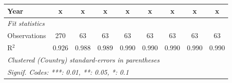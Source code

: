\begin{table}[htbp]
\begin{tabular}{lcccccccc}
      Year                                                    & x              & x       & x       & x             & x             & x             & x             & x\\  
      \midrule \emph{Fit statistics}\\
      Observations                                            & 270            & 63      & 63      & 63            & 63            & 63            & 63            & 63\\  
      R$^2$                                                   & 0.926          & 0.988   & 0.989   & 0.990         & 0.990         & 0.990         & 0.990         & 0.990\\  
      \midrule
      \multicolumn{9}{l}{\emph{Clustered (Country) standard-errors in parentheses}}\\
      \multicolumn{9}{l}{\emph{Signif. Codes: ***: 0.01, **: 0.05, *: 0.1}}\\
   \end{tabular}
\end{table}


